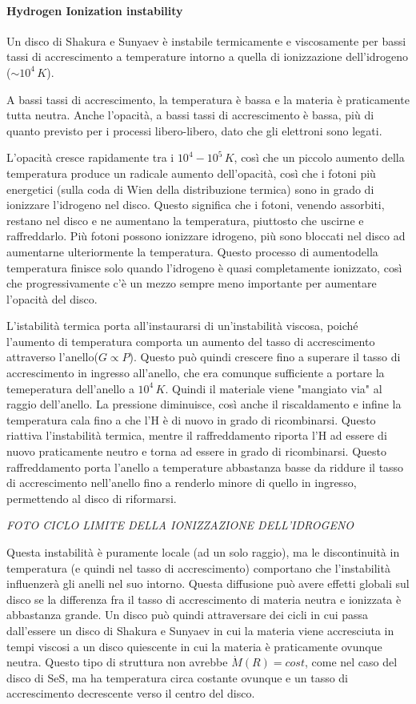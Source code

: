 \documentclass[a4paperbi]{article}
\begin{document}
	\paragraph{Hydrogen Ionization instability}
	Un disco di Shakura e Sunyaev è instabile termicamente e viscosamente per bassi tassi di accrescimento a temperature intorno a quella di ionizzazione dell'idrogeno ($\sim10^4\,K$).
	
	A bassi tassi di accrescimento, la temperatura è bassa e la materia è praticamente tutta neutra. Anche l'opacità, a bassi tassi di accrescimento è bassa, più di quanto previsto per i processi libero-libero, dato che gli elettroni sono legati.
	
	L'opacità cresce rapidamente tra i $10^4-10^5\,K$, così che un piccolo aumento della temperatura produce un radicale aumento dell'opacità, così che i fotoni più energetici (sulla coda di Wien della distribuzione termica) sono in grado di ionizzare l'idrogeno nel disco. Questo significa che i fotoni, venendo assorbiti, restano nel disco e ne aumentano la temperatura, piuttosto che uscirne e raffreddarlo. Più fotoni possono ionizzare idrogeno, più sono bloccati nel disco ad aumentarne ulteriormente la temperatura. Questo processo di aumentodella temperatura finisce solo quando l'idrogeno è quasi completamente ionizzato, così che progressivamente c'è un mezzo sempre meno importante per aumentare l'opacità del disco.
	
	L'istabilità termica porta all'instaurarsi di un'instabilità viscosa, poiché l'aumento di temperatura comporta un aumento del tasso di accrescimento attraverso l'anello($G\propto P$). Questo può quindi crescere fino a superare il tasso di accrescimento in ingresso all'anello, che era comunque sufficiente a portare la temeperatura dell'anello a $10^4\,K$. Quindi il materiale viene "mangiato via" al raggio dell'anello. La pressione diminuisce, così anche il riscaldamento e infine la temperatura cala fino a che l'H è di nuovo in grado di ricombinarsi. Questo riattiva l'instabilità termica, mentre il raffreddamento riporta l'H ad essere di nuovo praticamente neutro
 e torna ad essere in grado di ricombinarsi. Questo raffreddamento porta l'anello a temperature abbastanza basse da riddure il tasso di accrescimento nell'anello fino a renderlo minore di quello in ingresso, permettendo al disco di riformarsi.
 
\emph{FOTO CICLO LIMITE DELLA IONIZZAZIONE DELL'IDROGENO}

	Questa instabilità è puramente locale (ad un solo raggio), ma le discontinuità in temperatura (e quindi nel tasso di accrescimento) comportano che l'instabilità influenzerà gli anelli nel suo intorno. Questa diffusione può avere effetti globali sul disco se la differenza fra il tasso di accrescimento di materia neutra e ionizzata è abbastanza grande. Un disco può quindi attraversare dei cicli in cui passa dall'essere un disco di Shakura e Sunyaev in cui la materia viene accresciuta in tempi viscosi a un disco quiescente in cui la materia è praticamente ovunque neutra. Questo tipo di struttura non avrebbe $\dot{M}(R)=cost$, come nel caso del disco di SeS, ma ha temperatura circa costante ovunque e un tasso di accrescimento decrescente verso il centro del disco.
\end{document}

